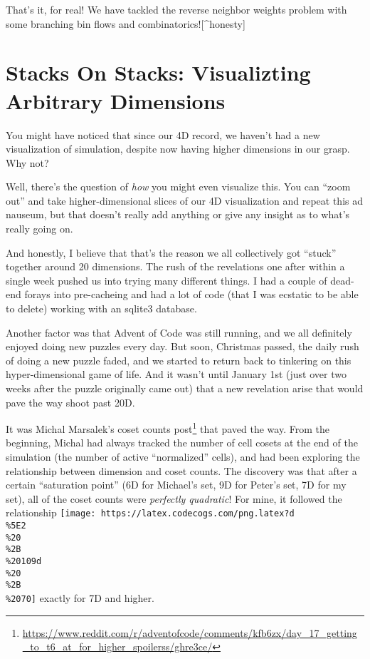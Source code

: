 \documentclass[]{article}
\renewcommand{\href}[2]{#2\footnote{\url{#1}}}
\begin{document}
That's it, for real! We have tackled the reverse neighbor weights problem with
some branching bin flows and combinatorics!{[}\^{}honesty{]}

\hypertarget{stacks-on-stacks-visualizting-arbitrary-dimensions}{%
\section{Stacks On Stacks: Visualizting Arbitrary
Dimensions}\label{stacks-on-stacks-visualizting-arbitrary-dimensions}}

You might have noticed that since our 4D record, we haven't had a new
visualization of simulation, despite now having higher dimensions in our grasp.
Why not?

Well, there's the question of \emph{how} you might even visualize this. You can
``zoom out'' and take higher-dimensional slices of our 4D visualization and
repeat this ad nauseum, but that doesn't really add anything or give any insight
as to what's really going on.

And honestly, I believe that that's the reason we all collectively got ``stuck''
together around 20 dimensions. The rush of the revelations one after within a
single week pushed us into trying many different things. I had a couple of
dead-end forays into pre-cacheing and had a lot of code (that I was ecstatic to
be able to delete) working with an sqlite3 database.

Another factor was that Advent of Code was still running, and we all definitely
enjoyed doing new puzzles every day. But soon, Christmas passed, the daily rush
of doing a new puzzle faded, and we started to return back to tinkering on this
hyper-dimensional game of life. And it wasn't until January 1st (just over two
weeks after the puzzle originally came out) that a new revelation arise that
would pave the way shoot past 20D.

It was
\href{https://www.reddit.com/r/adventofcode/comments/kfb6zx/day_17_getting_to_t6_at_for_higher_spoilerss/ghre3ce/}{Michal
Marsalek's coset counts post} that paved the way. From the beginning, Michal had
always tracked the number of cell cosets at the end of the simulation (the
number of active ``normalized'' cells), and had been exploring the relationship
between dimension and coset counts. The discovery was that after a certain
``saturation point'' (6D for Michael's set, 9D for Peter's set, 7D for my set),
all of the coset counts were \emph{perfectly quadratic}! For mine, it followed
the relationship
\texttt{[image: https://latex.codecogs.com/png.latex?d\\\%5E2\\\%20\\\%2B\\\%20109d\\\%20\\\%2B\\\%2070]}
exactly for 7D and higher.
\end{document}
